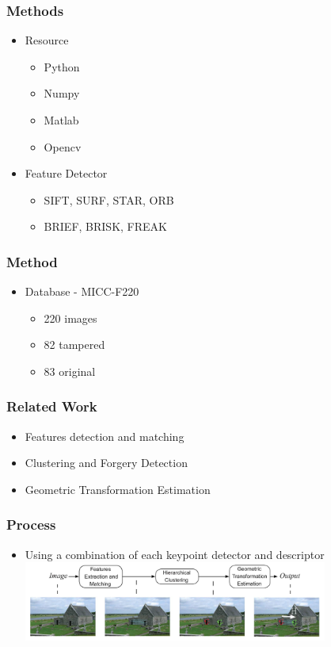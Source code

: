 \documentclass{beamer}
\begin{document}
    \begin{frame}
        \frametitle{Methods}
        \begin{itemize} [<+->]
            \item Resource
                \begin{itemize}
                    \item Python
                    \item Numpy
                    \item Matlab
                    \item Opencv
                \end{itemize}
            \item Feature Detector
                \begin{itemize}
                    \item SIFT, SURF, STAR, ORB
                    \item BRIEF, BRISK, FREAK
                \end{itemize}
        \end{itemize}
    \end{frame}
    
    \begin{frame}
      \frametitle{Method}
      \begin{itemize}
            	\item Database - MICC-F220
        		\begin{itemize}
            		\item 220 images
			\item 82 tampered
			\item 83 original
        		\end{itemize}
	\end{itemize}
    \end{frame}

    
     \begin{frame}
      \frametitle{Related Work}
        \begin{itemize}
            	\item Features detection and matching
		\item Clustering and Forgery Detection
		\item Geometric Transformation Estimation
        \end{itemize}
    \end{frame}

    \begin{frame}
        \frametitle{Process}
        \begin{itemize}[<+->]
            \item Using a combination of each keypoint detector and descriptor
            \includegraphics[width=10cm]{process}
        \end{itemize}
    \end{frame}
\end{document}
